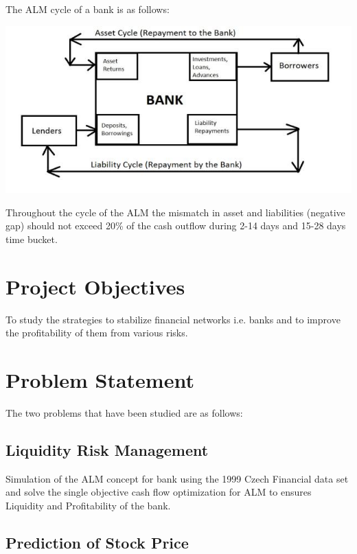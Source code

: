 		The ALM cycle of a bank is as follows:

		\begin{center}
		\includegraphics[width=\linewidth]{figures/ALM_Cycle_of_a_Bank.jpg}	
		\label{fig:ALM Cycle of a Bank}
		\end{center}

		Throughout the cycle of the ALM the mismatch in asset and liabilities (negative gap) should not exceed 20\% of the cash outflow during 2-14 days and 15-28 days time bucket.

	
\section{Project Objectives}

	To study the strategies to stabilize financial networks i.e. banks and to improve the profitability of them from various risks. 

\section{Problem Statement}

	The two problems that have been studied are as follows:
	\subsection{Liquidity Risk Management}

Simulation of the ALM concept for bank using the 1999 Czech Financial data set and solve the single objective cash flow optimization for ALM to ensures Liquidity and Profitability of the bank. 

	\subsection{Prediction of Stock Price}

